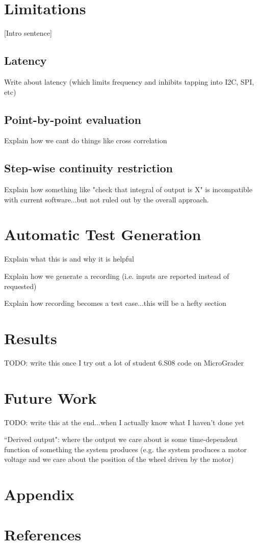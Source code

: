 \documentclass[12pt]{article}
\begin{document}
\newpage
\section{Limitations}
[Intro sentence]

\subsection{Latency}
Write about latency (which limits frequency and inhibits tapping into I2C, SPI, etc)

\subsection{Point-by-point evaluation}
Explain how we cant do things like cross correlation

\subsection{Step-wise continuity restriction}
Explain how something like "check that integral of output is X" is incompatible with current software...but not ruled out by the overall approach.


\newpage
\section{Automatic Test Generation}
Explain what this is and why it is helpful

Explain how we generate a recording (i.e. inputs are reported instead of requested)

Explain how recording becomes a test case...this will be a hefty section

\newpage
\section{Results}
TODO: write this once I try out a lot of student 6.S08 code on MicroGrader

\newpage
\section{Future Work}
TODO: write this at the end...when I actually know what I haven't done yet

``Derived output": where the output we care about is some time-dependent function of something the system produces (e.g. the system produces a motor voltage and we care about the position of the wheel driven by the motor)

\newpage
\section{Appendix}

\newpage
\section{References}
\end{document}
